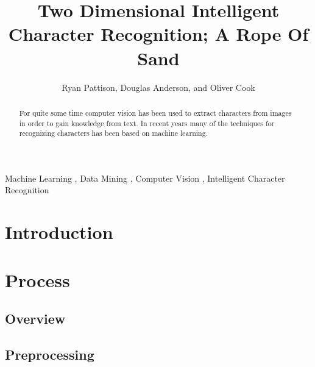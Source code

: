 \documentclass[preprint,3p,12pt]{elsarticle}
\begin{document}
\begin{frontmatter}

\title{Two Dimensional Intelligent Character Recognition; A Rope Of Sand}


\author[ryan,doug,oliver]{Ryan Pattison, Douglas Anderson, and Oliver Cook}
\address[ryan]{ryan.m.pattison@gmail.com}
\address[doug]{dander01@uoguelph.ca}
\address[oliver]{cooko@uoguelph.ca}


\begin{abstract}

For quite some time computer vision has been used to extract characters from
images in order to gain knowledge from text. In recent years many of the
techniques for recognizing characters has been based on machine learning.

\end{abstract}

\begin{keyword}
Machine Learning \sep
Data Mining \sep
Computer Vision \sep
Intelligent Character Recognition


\end{keyword}

\end{frontmatter}


\section{Introduction}
\label{intro}
\lipsum[1-2]

\section{Process}
\label{process}

\subsection{Overview}
\label{process:overview}

\subsection{Preprocessing}
\label{process:preprocessing}
\end{document}
